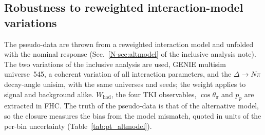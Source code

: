 \documentclass[11pt,a4paper]{article}
\newcommand{\noteref}[2]{#1~\ref{N-#2} of the inclusive analysis note}
\begin{document}
\subsection{Robustness to reweighted interaction-model variations}
\label{sec:pt_altmodel}

The pseudo-data are thrown from a reweighted interaction model and unfolded with the nominal response
(\noteref{Sec.}{sec:altmodel}). The two variations of the inclusive analysis are used, GENIE multisim
universe~545, a coherent variation of all interaction parameters, and the $\Delta\to N\pi$ decay-angle
unisim, with the same universes and seeds; the weight applies to signal and background alike.
$W_\mathrm{had}$, the four TKI observables, $\cos\theta_\pi$ and $p_p$ are extracted in FHC. The truth
of the pseudo-data is that of the alternative model, so the closure measures the bias from the model
mismatch, quoted in units of the per-bin uncertainty (Table~\ref{tab:pt_altmodel}).
\end{document}

